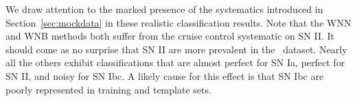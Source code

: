 We draw attention to the marked presence of the systematics introduced in Section~\ref{sec:mockdata} in these realistic classification results.
Note that the WNN and WNB methods both suffer from the cruise control systematic on SN II.
It should come as no surprise that SN II are more prevalent in the \snphotcc\ dataset.
Nearly all the others exhibit classifications that are almost perfect for SN Ia, perfect for SN II, and noisy for SN Ibc.
A likely cause for this effect is that SN Ibc are poorly represented in training and template sets.
%
